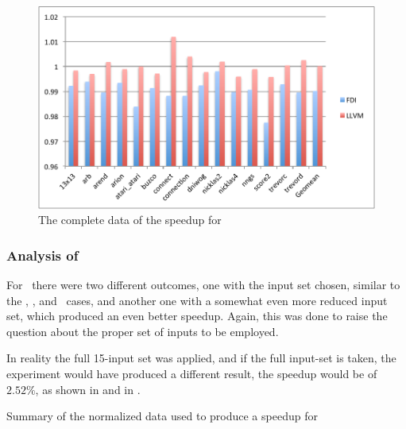 \begin{figure}
  \centering
  \includegraphics[width=1.00\linewidth]{Figures/speedupgbkall}
  \caption{The complete data of the speedup for \gobmk}
  \label{fig:gobmkall}
\end{figure}


\subsubsection{Analysis of \gcc}

For \gcc\ there were two different outcomes, one with the input set chosen, similar to the \bzip, \gzip, and \gobmk\ cases, and another one with a somewhat even more reduced input set, which produced an even better speedup. Again, this was done to raise the question about the proper set of inputs to be employed.

In reality the full 15-input set was applied, and if the full input-set is taken, the experiment would have produced a different result, the speedup would be of $2.52 \%$, as shown in  and in .

\begin{table}
  \centering
  \begin{tiny}
  
  \end{tiny}
  \caption{Summary of the normalized data used to produce a speedup for \gcc}
  \label{tab:fullspeedup}
\end{table}

